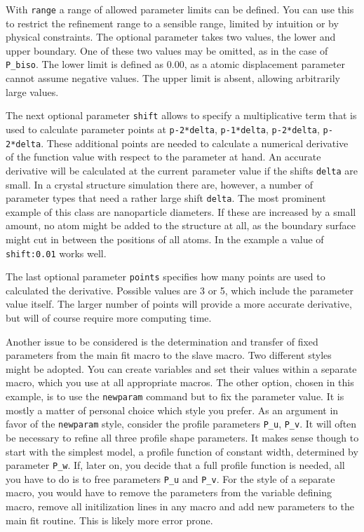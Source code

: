 With {\tt range} a range of allowed parameter limits can be defined. You can 
use this to restrict the refinement range to a sensible range, limited by 
intuition or by physical constraints. The optional parameter takes two 
values, the lower and upper boundary. One of these two values may be omitted,
as in the case of {\tt P\_biso}. The lower limit is defined as 0.00, as a 
atomic displacement parameter cannot assume negative values. The upper limit
is absent, allowing arbitrarily large values. 

The next optional parameter {\tt shift} allows to specify a multiplicative 
term that is used to calculate parameter points at {\tt p-2*delta}, 
{\tt p-1*delta}, {\tt p-2*delta}, {\tt p-2*delta}. These additional points are 
needed to calculate a numerical derivative of the function value with respect
to the parameter at hand. An accurate derivative will be calculated at the 
current parameter value if the shifts {\tt delta} are small. In a crystal 
structure simulation there are, however, a number of parameter types that need
a rather large shift {\tt delta}. The most prominent example of this class are
nanoparticle diameters. If these are increased by a small amount, no atom might 
be added to the structure at all, as the boundary surface might cut in between 
the positions of all atoms. In the example a value of {\tt shift:0.01} works 
well.

The last optional parameter {\tt points} specifies how many points are  used to 
calculated the derivative. Possible values are 3 or 5, which include the 
parameter value itself. The larger number of points will provide a more
accurate derivative, but will of course require more computing time.

Another issue to be considered is the determination and transfer of fixed 
parameters from the main fit macro to the slave macro. Two different styles 
might be adopted. You can create variables and set their values within a 
separate macro, which you use at all appropriate macros. The other option,
chosen in this example, is to use the {\tt newparam} command but to fix the 
parameter value. It is mostly a matter of personal choice which style you 
prefer. As an argument in favor of the {\tt newparam} style, consider the
profile parameters {\tt P\_u}, {\tt P\_v}. It will often be necessary to 
refine all three profile shape parameters. It makes sense though to start
with the simplest model, a profile function of constant width, determined
by parameter {\tt P\_w}. If, later on, you decide that a full profile 
function is needed, all you have to do is to free parameters {\tt P\_u} and
{\tt P\_v}. For the style of a separate macro, you would have to remove 
the parameters from the variable defining macro, remove all initilization
lines in any macro and add new parameters to the main fit routine. This is
likely more error prone.

